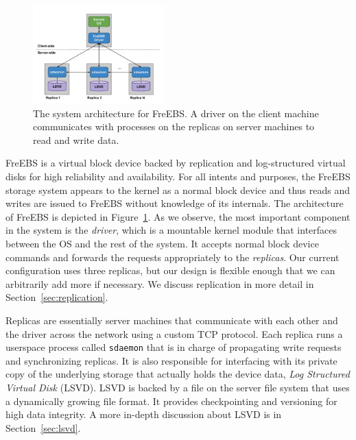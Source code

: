 \begin{figure}[b!]
    \includegraphics[width=0.45\textwidth]{./figures/systemarch.pdf}    
    \caption{The system architecture for FreEBS. A driver on the client 
            machine communicates with processes on the replicas on server 
            machines to read and write data.}
    \label{fig:architecture}
\end{figure}


FreEBS is a virtual block device backed by replication and log-structured
virtual disks for high reliability and availability. For all intents and 
purposes, the FreEBS storage system appears to the kernel as a normal block
device and thus reads and writes are issued to FreEBS without knowledge of 
its internals. The architecture of FreEBS is depicted in 
Figure~\ref{fig:architecture}. As we observe, the most important component in
the system is the \emph{driver}, which is a mountable kernel module that 
interfaces between the OS and the rest of the system. It accepts normal 
block device commands and forwards the requests appropriately to the 
\emph{replicas}. Our current configuration uses three replicas, but our 
design is flexible enough that we can arbitrarily add more if necessary. We 
discuss replication in more detail in Section~\ref{sec:replication}.
 
Replicas are essentially server machines that communicate with each other 
and the driver across the network using a custom TCP protocol. Each replica 
runs a userspace process called \texttt{sdaemon} that is in 
charge of propagating write requests and synchronizing replicas. It is also
responsible for interfacing with its private copy of the underlying storage 
that actually holds the device data, \emph{Log Structured Virtual Disk}
(LSVD). LSVD is backed by a file on the server file system that uses a 
dynamically growing file format. It provides checkpointing and versioning 
for high data integrity. A more in-depth discussion about LSVD is in 
Section~\ref{sec:lsvd}.


